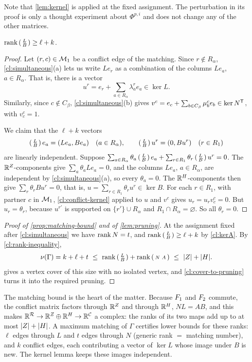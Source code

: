 Note that \cref{lem:kernel} is applied at the fixed assignment. The
perturbation in its proof is only a thought experiment about $\Phi^{p,i}$
and does not change any of the other matrices.

\begin{claim}\label{cl:kerA}
$\operatorname{rank}\left(\begin{smallmatrix}L\\ B\end{smallmatrix}\right)\ge\ell+k$.
\end{claim}

\begin{proof}
Let $(r,c)\in\mathcal M_1$ be a conflict edge of the matching. Since $r\notin R_\alpha$,
\cref{cl:simultaneous}(a) lets us write $Le_r$ as a combination of the
columns $Le_a$, $a\in R_\alpha$. That is, there is a vector
\[
 u^r=e_r+\sum_{a\in R_\alpha}\lambda^r_ae_a\in\ker L .
\]
Similarly, since $c\notin C_\beta$, \cref{cl:simultaneous}(b) gives
$v^c=e_c+\sum_{b\in C_\beta}\mu^c_be_b\in\ker N^\mathsf T$, with $v^c_c=1$.

We claim that the $\ell+k$ vectors
\[
 \left(\begin{smallmatrix}L\\ B\end{smallmatrix}\right) e_a=(Le_a,Be_a)\quad(a\in R_\alpha),\qquad
 \left(\begin{smallmatrix}L\\ B\end{smallmatrix}\right) u^r=(0,Bu^r)\quad(r\in R_1)
\]
are linearly independent. Suppose
$\sum_{a\in R_\alpha}\theta_a\left(\begin{smallmatrix}L\\ B\end{smallmatrix}\right) e_a+\sum_{r\in R_1}\theta_r\left(\begin{smallmatrix}L\\ B\end{smallmatrix}\right) u^r=0$.
The $\mathbb R^Z$-components give $\sum_a\theta_aLe_a=0$, and the columns $Le_a$,
$a\in R_\alpha$, are independent by \cref{cl:simultaneous}(a), so every
$\theta_a=0$. The $\mathbb R^H$-components then give $\sum_r\theta_rBu^r=0$, that
is, $u=\sum_{r\in R_1}\theta_ru^r\in\ker B$. For each $r\in R_1$, with
partner $c$ in $\mathcal M_1$, \cref{cl:conflict-kernel} applied to $u$ and $v^c$
gives $u_r=u_rv^c_c=0$. But $u_r=\theta_r$, because $u^{r'}$ is supported on
$\{r'\}\cup R_\alpha$ and $R_1\cap R_\alpha=\varnothing$. So all $\theta_r=0$.
\end{proof}

\begin{proof}[Proof of \cref{prop:matching-bound} and of \cref{lem:pruning}]
At the assignment fixed after \cref{cl:simultaneous} we have $\operatorname{rank} N=t$,
and $\operatorname{rank}\left(\begin{smallmatrix}L\\ B\end{smallmatrix}\right)\ge\ell+k$ by \cref{cl:kerA}. By \cref{cl:rank-inequality},
\[
 \nu(\Gamma)=k+\ell+t\ \le\ \rank\LB+\rank\NA\ \le\ \abs Z+\abs H .
\]
 gives a vertex cover of this size with no isolated vertex,
and \cref{cl:cover-to-pruning} turns it into the required pruning.
\end{proof}

\begin{idea}
The matching bound is the heart of the matter. Because $F_1$ and $F_2$
commute, the conflict matrix factors through $\mathbb R^Z$ and through $\mathbb R^H$,
$NL=AB$, and this makes $\mathbb R^{\mathcal R}\to\mathbb R^Z\oplus\mathbb R^H\to\mathbb R^{\mathcal C}$ a
complex: the ranks of its two maps add up to at most $\lvert Z\rvert+\lvert H\rvert$. A
maximum matching of $\Gamma$ certifies lower bounds for these ranks:
$\ell$ edges through $L$ and $t$ edges through $N$ (generic rank $=$
matching number), and $k$ conflict edges, each contributing a vector of
$\ker L$ whose image under $B$ is new. The kernel lemma keeps these images
independent.
\end{idea}

